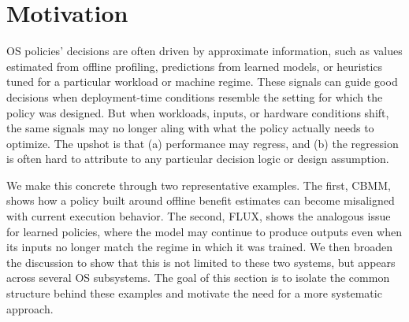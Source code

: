 \section{Motivation}\label{sec:background}

 OS policies' decisions are often driven by approximate information, such as values estimated from offline profiling, predictions from learned models, or heuristics tuned for a particular workload or machine regime. These signals can guide good decisions when deployment-time conditions resemble the setting for which the policy was designed. But when workloads, inputs, or hardware conditions shift, the same signals may no longer aling with what the policy actually needs to optimize. The upshot is that (a) performance may regress, and (b) the regression is often hard to attribute to any particular decision logic or design assumption.

We make this concrete through two representative examples. The first, CBMM, shows how a policy built around offline benefit estimates can become misaligned with current execution behavior. The second, FLUX, shows the analogous issue for learned policies, where the model may continue to produce outputs even when its inputs no longer match the regime in which it was trained. We then broaden the discussion to show that this is not limited to these two systems, but appears across several OS subsystems. The goal of this section is to isolate the common structure behind these examples and motivate the need for a more systematic approach.


